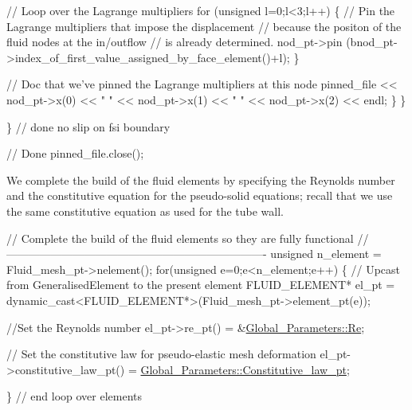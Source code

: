 \begin{DoxyCodeInclude}
       \textcolor{comment}{// Loop over the Lagrange multipliers}
       \textcolor{keywordflow}{for} (\textcolor{keywordtype}{unsigned} l=0;l<3;l++)
        \{
         \textcolor{comment}{// Pin the Lagrange multipliers that impose the displacement}
         \textcolor{comment}{// because the positon of the fluid nodes at the in/outflow}
         \textcolor{comment}{// is already determined. }
         nod\_pt->pin
          (bnod\_pt->index\_of\_first\_value\_assigned\_by\_face\_element()+l);
        \}

       \textcolor{comment}{// Doc that we've pinned the Lagrange multipliers at this node}
       pinned\_file << nod\_pt->x(0) << \textcolor{stringliteral}{" "}
                   << nod\_pt->x(1) << \textcolor{stringliteral}{" "}
                   << nod\_pt->x(2) << endl;
      \}
    \}
   
  \} \textcolor{comment}{// done no slip on fsi boundary}

 \textcolor{comment}{// Done}
 pinned\_file.close();

\end{DoxyCodeInclude}


We complete the build of the fluid elements by specifying the Reynolds number and the constitutive equation for the pseudo-\/solid equations; recall that we use the same constitutive equation as used for the tube wall.


\begin{DoxyCodeInclude}
 
 \textcolor{comment}{// Complete the build of the fluid elements so they are fully functional}
 \textcolor{comment}{//----------------------------------------------------------------------}
 \textcolor{keywordtype}{unsigned} n\_element = Fluid\_mesh\_pt->nelement();
 \textcolor{keywordflow}{for}(\textcolor{keywordtype}{unsigned} e=0;e<n\_element;e++)
  \{
   \textcolor{comment}{// Upcast from GeneralisedElement to the present element}
   FLUID\_ELEMENT* el\_pt = 
    \textcolor{keyword}{dynamic\_cast<}FLUID\_ELEMENT*\textcolor{keyword}{>}(Fluid\_mesh\_pt->element\_pt(e));
   
   \textcolor{comment}{//Set the Reynolds number}
   el\_pt->re\_pt() = &\hyperlink{namespaceGlobal__Parameters_a9d72e94a9305c6a310940a6a427ebe06}{Global\_Parameters::Re};
   
   \textcolor{comment}{// Set the constitutive law for pseudo-elastic mesh deformation}
   el\_pt->constitutive\_law\_pt() =
    \hyperlink{namespaceGlobal__Parameters_adbd1f040f375c96fe56b3f475f7dbec2}{Global\_Parameters::Constitutive\_law\_pt};
   
  \} \textcolor{comment}{// end loop over elements}

\end{DoxyCodeInclude}


